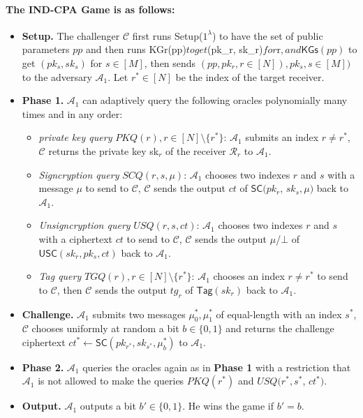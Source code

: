\documentclass[a4paper,11pt,onecolumn]{elsarticle}
\begin{document}
			\paragraph{\textsf{The IND-CPA} Game is as follows:}
					\begin{itemize}
						\item \textbf{Setup.} The challenger  $\mathcal{C}$ first runs \textsf{Setup($1^{\lambda}$)} to have the set of  public parameters $pp$ and then runs \textsf{KGr}(pp)$ to get $(pk_{r}, sk_{r})$ for $r\in[N]$, and \textsf{KGs}(pp)$ to get $(pk_{s}, sk_{s})$ for $s\in[M]$, then sends $(pp, pk_{r}, r \in [N]), pk_{s}, s \in [M])$ to the adversary $\mathcal{A}_1$. Let $r^*\in[N]$ be the index of the target receiver.
						\item \textbf{Phase 1.}  $\mathcal{A}_1$ can adaptively query the following oracles polynomially many times  and in any order:
						\begin{itemize}
							\item \textit{private key query} $ PKQ(r), r \in [N]\setminus \{r^*\}$: $\mathcal{A}_1$ submits an index $r \neq r^*$, $\mathcal{C}$ returns the private key sk$_{r}$ of the receiver $\mathcal{R}_{r}$  to $\mathcal{A}_1$. 
							\item \textit{Signcryption query} $ SCQ(r,s,\mu)$: $\mathcal{A}_1$ chooses two indexes $r$ and $s$ with a message $\mu$ to send to $\mathcal{C}$, $\mathcal{C}$ sends the output $ct$ of $\textsf{SC}(pk_{r}$, $sk_{s},\mu)$ back to $\mathcal{A}_1$.
							\item \textit{Unsigncryption query}  $ USQ(r,s,ct)$: $\mathcal{A}_1$ chooses two indexes $r$ and $s$ with a ciphertext $ct$ to send to $\mathcal{C}$, $\mathcal{C}$ sends the output $\mu$/$\bot$ of $\textsf{USC}(sk_{r},pk_{s},ct)$ back to $\mathcal{A}_1$.
							\item \textit{Tag query} $  TGQ(r),  r \in [N]\setminus \{r^*\}$: $\mathcal{A}_1$ chooses an index $r \neq r^*$ to send to $\mathcal{C}$, then $\mathcal{C}$ sends the output $tg_{r}$ of $\textsf{Tag}(sk_{r})$ back to $\mathcal{A}_1$.
						\end{itemize}
						\item \textbf{Challenge.} $\mathcal{A}_1$ submits two messages $\mu^*_0, \mu^*_1$ of equal-length with an index $s^*$, $\mathcal{C}$ chooses uniformly at random a bit $b \in \{0,1\}$ and returns the challenge ciphertext $ct^* \leftarrow \mathsf{SC}(pk_{r^*}, sk_{s^*},\mu^*_b)$ to $\mathcal{A}_1$.
						\item \textbf{Phase 2.} $\mathcal{A}_1$ queries the oracles again as in \textbf{Phase 1} with a restriction that $\mathcal{A}_1$ is not allowed to make the queries $ PKQ(r^*)$ and   $ USQ(r^*,s^*$, $ct^*)$.
						\item \textbf{Output.} $\mathcal{A}_1$  outputs a bit $b' \in \{0,1\}$. He wins the game if $b'=b$.
					\end{itemize}	
					
\end{document}

